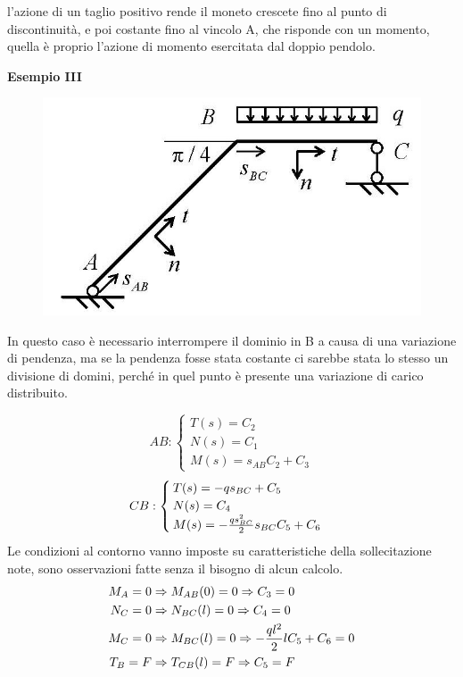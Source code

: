 \documentclass{article}
\begin{document}
\begin{adjustwidth}{2in}{}
	l'azione di un taglio positivo rende il moneto crescete fino al punto di discontinuità, e poi costante fino al vincolo A, che risponde con un momento, quella è proprio l'azione di momento esercitata dal doppio pendolo. \newline 
\newpage	
	\begin{center}
		\textbf{Esempio III}
	\end{center}
	
	\begin{figure}[H]
		\centering
		\includegraphics[width=0.3\linewidth]{"immagini/1.PARTE5_Pagina_23(2)"}
	\end{figure}
	In questo caso è necessario interrompere il dominio in B a causa di una variazione di pendenza, ma se la pendenza fosse stata costante ci sarebbe stata lo stesso un divisione di domini, perché in quel punto è presente una variazione di carico distribuito.
		
	\[
	AB:	
	\begin{cases}
		T(s) = C_2 \\
		
		N(s) = C_1 \\
		
		M(s) =  s_{AB}C_2 + C_3
	\end{cases}
	\] 
	\[
	CB: \begin{cases}
		T(s) = -qs_{BC} + C_5 \\
		
		N(s) = C_4 \\
		
		M(s) = -{qs^2_{BC}\over2} s_{BC}C_5 + C_6
	\end{cases}
	\]
	Le condizioni al contorno vanno imposte su caratteristiche della sollecitazione note, sono osservazioni fatte senza il bisogno di alcun calcolo. 
	\[
	\begin{split}
		M_A= 0 & \Rightarrow M_{AB} (0)= 0 \Rightarrow C_3 = 0 \\
		N_C= 0 & \Rightarrow N_{BC} (l)= 0 \Rightarrow C_4 = 0 \\
		M_C= 0 & \Rightarrow M_{BC} (l)= 0 \Rightarrow -{ql^2\over2} lC_5 + C_6 = 0 \\
		T_B= F & \Rightarrow T_{CB} (l)= F \Rightarrow C_5 = F \\
	\end{split} \]
	

\end{adjustwidth}
\end{document}
